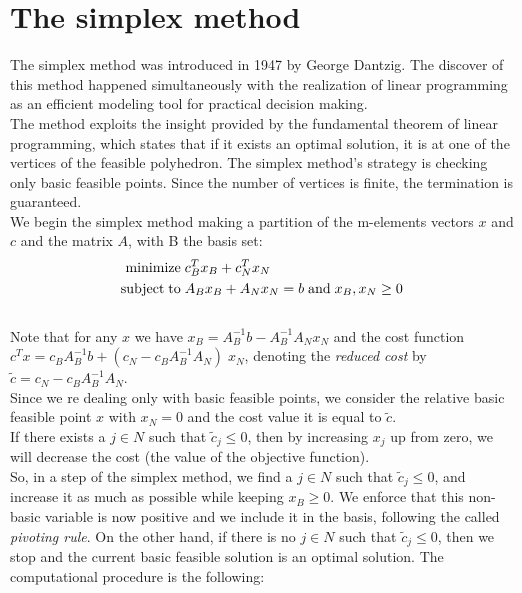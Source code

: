 \documentclass[a4paper,10 pt,titlepage,twoside]{book}
\theoremstyle{plain}
\theoremstyle{definition}
\theoremstyle{remark}
\begin{document}
\chapter{The simplex method}
The simplex method was introduced in 1947 by George Dantzig. The discover of this method happened simultaneously with the realization of linear programming as an efficient modeling tool for practical decision making.\\
The method exploits the insight provided by the fundamental theorem
of linear programming, which states that if it exists an optimal solution, it is at one of the vertices of the feasible polyhedron. The simplex method's strategy is checking only basic feasible points. Since the number of vertices is finite, the termination is guaranteed.\\
We begin the simplex method making a partition of the m-elements vectors $x$ and $c$ and the matrix $A$, with B the basis set:
\begin{equation}
\begin{split}
\text{minimize\;} &c^{T}_{B}x_{B}+c^{T}_{N}x_{N}\\
\text{subject\;to\;}&A_{B}x_{B}+A_{N}x_{N} = b\text{\;and\;}x_{B}, x_{N}\geq0
\end{split}
\end{equation}
 \\Note that for any $x$ we have $x_{B}=A_{B}^{-1}b-A_{B}^{-1}A_{N}x_{N}$ and the cost function $c^{T}x=c_{B}A_{B}^{-1}b+(c_{N}-c_{B}A_{B}^{-1}A_{N})\;x_{N}$, denoting the \textit{reduced cost} by $\widetilde{c}=c_{N}-c_{B}A_{B}^{-1}A_{N}$.\\ Since we re dealing only with basic feasible points, we consider the relative basic feasible point $x$ with $x_{N}= 0$ and the cost value it is equal to $\widetilde{c}$.\\
 If there exists a $j \in N$ such that $\widetilde{c}_{j} \leq 0$, then by increasing $x_{j}$ up from zero, we will decrease the cost (the value of the objective function).\\
So, in a step of the simplex method, we find a $j \in N$ such that $\widetilde{c}_{j} \leq 0$, and increase it as much as possible while keeping $x_{B} \geq 0$. We enforce that this non-basic variable is now positive and we include it in the basis, following the called \textit{pivoting rule}.
On the other hand, if there is no $j \in N$ such that $\widetilde{c}_{j} \leq 0$, then we stop and the current basic feasible solution is an optimal solution. The computational procedure is the following:
\end{document}
